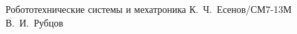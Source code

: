 \documentclass{bmstu}
\begin{document}
                {Робототехнические системы и мехатроника}                       %
                {}                                                              %
                {К.~Ч.~Есенов/СМ7-13М}                                          %
                {В.~И.~Рубцов}                                                 %
                {}                                                              %
\end{document}
